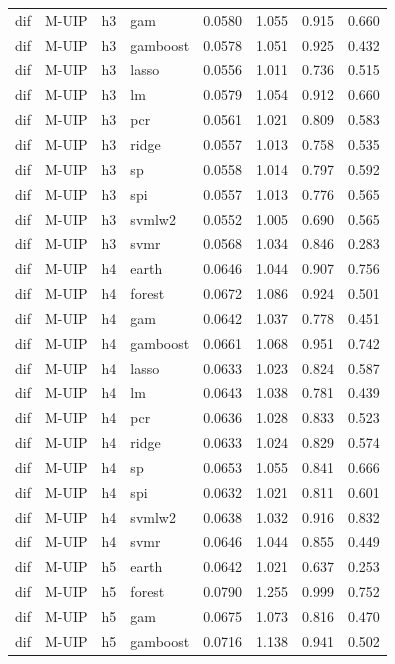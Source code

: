 \begin{ThreePartTable}
\begin{longtable}[t]{llclcccc}
dif & M-UIP & h3 & gam & 0.0580 & 1.055 & 0.915 & 0.660\\
dif & M-UIP & h3 & gamboost & 0.0578 & 1.051 & 0.925 & 0.432\\
dif & M-UIP & h3 & lasso & 0.0556 & 1.011 & 0.736 & 0.515\\
dif & M-UIP & h3 & lm & 0.0579 & 1.054 & 0.912 & 0.660\\
dif & M-UIP & h3 & pcr & 0.0561 & 1.021 & 0.809 & 0.583\\
dif & M-UIP & h3 & ridge & 0.0557 & 1.013 & 0.758 & 0.535\\
dif & M-UIP & h3 & sp & 0.0558 & 1.014 & 0.797 & 0.592\\
dif & M-UIP & h3 & spi & 0.0557 & 1.013 & 0.776 & 0.565\\
dif & M-UIP & h3 & svmlw2 & 0.0552 & 1.005 & 0.690 & 0.565\\
dif & M-UIP & h3 & svmr & 0.0568 & 1.034 & 0.846 & 0.283\\
\addlinespace
dif & M-UIP & h4 & earth & 0.0646 & 1.044 & 0.907 & 0.756\\
dif & M-UIP & h4 & forest & 0.0672 & 1.086 & 0.924 & 0.501\\
dif & M-UIP & h4 & gam & 0.0642 & 1.037 & 0.778 & 0.451\\
dif & M-UIP & h4 & gamboost & 0.0661 & 1.068 & 0.951 & 0.742\\
dif & M-UIP & h4 & lasso & 0.0633 & 1.023 & 0.824 & 0.587\\
dif & M-UIP & h4 & lm & 0.0643 & 1.038 & 0.781 & 0.439\\
dif & M-UIP & h4 & pcr & 0.0636 & 1.028 & 0.833 & 0.523\\
dif & M-UIP & h4 & ridge & 0.0633 & 1.024 & 0.829 & 0.574\\
dif & M-UIP & h4 & sp & 0.0653 & 1.055 & 0.841 & 0.666\\
dif & M-UIP & h4 & spi & 0.0632 & 1.021 & 0.811 & 0.601\\
dif & M-UIP & h4 & svmlw2 & 0.0638 & 1.032 & 0.916 & 0.832\\
dif & M-UIP & h4 & svmr & 0.0646 & 1.044 & 0.855 & 0.449\\
\addlinespace
dif & M-UIP & h5 & earth & 0.0642 & 1.021 & 0.637 & 0.253\\
dif & M-UIP & h5 & forest & 0.0790 & 1.255 & 0.999 & 0.752\\
dif & M-UIP & h5 & gam & 0.0675 & 1.073 & 0.816 & 0.470\\
dif & M-UIP & h5 & gamboost & 0.0716 & 1.138 & 0.941 & 0.502\\

\end{longtable}
\end{ThreePartTable}

